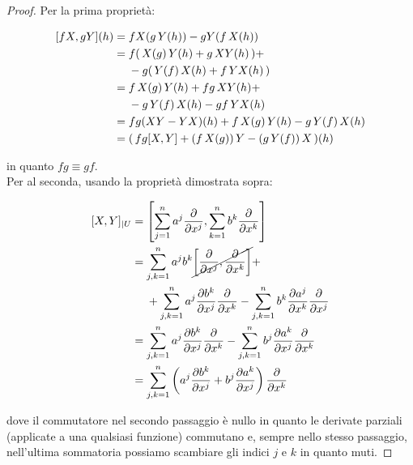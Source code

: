 \begin{proof}
	Per la prima proprietà:
	
	\begin{align}
		\begin{split}
			[f X, g Y](h) &= f X(g \, Y(h)) - g Y(f \, X(h))\\
			&= f ( \, X(g) \, Y(h) + g \, XY(h) \, ) + \\
			& \hal - g ( \, Y(f) \, X(h) + f \, YX(h) \, )\\
			&= f \, X(g) \, Y(h) + f g \, XY(h) + \\
			& \hal - g \, Y(f) \, X(h) - g f \, YX(h)\\
			&= f g (XY-YX)(h) + f \, X(g) \, Y(h) - g \, Y(f) \, X(h)\\
			&= ( \, f g [X,Y] + (f \, X(g)) \, Y - (g \, Y(f)) \, X \, )(h)
		\end{split}
	\end{align}

	in quanto $ fg \equiv gf $.\\
	Per al seconda, usando la proprietà dimostrata sopra:
	
	\begin{align}
		\begin{split}
			[X,Y]_{|U} &= \left[ \sum_{j=1}^{n} a^{j} \dfrac{\partial}{\partial x^{j}} , \sum_{k=1}^{n} b^{k} \dfrac{\partial}{\partial x^{k}} \right]\\
			&= \sum_{j,k=1}^{n} a^{j} b^{k} \cancel{\left[ \dfrac{\partial}{\partial x^{j}} , \dfrac{\partial}{\partial x^{k}} \right]} + \\
			& \hal + \sum_{j,k=1}^{n} a^{j} \dfrac{\partial b^{k}}{\partial x^{j}} \dfrac{\partial}{\partial x^{k}} - \sum_{j,k=1}^{n} b^{k} \dfrac{\partial a^{j}}{\partial x^{k}} \dfrac{\partial}{\partial x^{j}}\\
			&= \sum_{j,k=1}^{n} a^{j} \dfrac{\partial b^{k}}{\partial x^{j}} \dfrac{\partial}{\partial x^{k}} - \sum_{j,k=1}^{n} b^{j} \dfrac{\partial a^{k}}{\partial x^{j}} \dfrac{\partial}{\partial x^{k}}\\
			&= \sum_{j,k=1}^{n} \left( a^{j} \dfrac{\partial b^{k}}{\partial x^{j}} + b^{j} \dfrac{\partial a^{k}}{\partial x^{j}} \right) \dfrac{\partial}{\partial x^{k}}
		\end{split}
	\end{align}

	dove il commutatore nel secondo passaggio è nullo in quanto le derivate parziali (applicate a una qualsiasi funzione) commutano e, sempre nello stesso passaggio, nell'ultima sommatoria possiamo scambiare gli indici $ j $ e $ k $ in quanto muti.
\end{proof}

